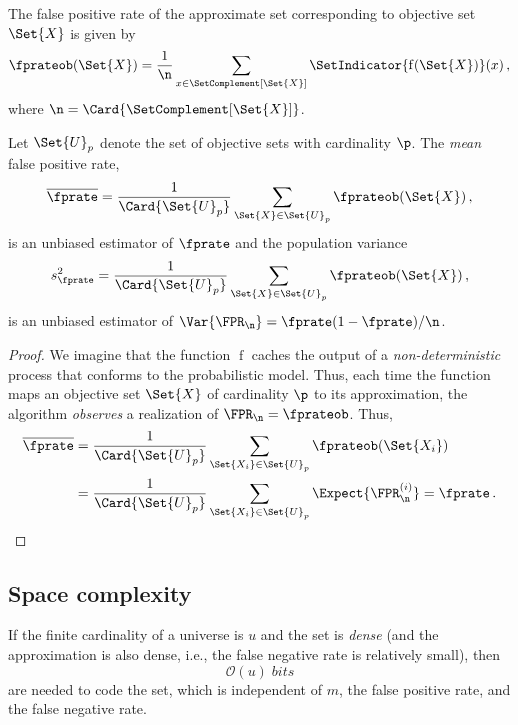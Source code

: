 \documentclass[ ../main.tex]{subfiles}
\begin{document}
The false positive rate of the approximate set corresponding 
to objective set $\Set{X}$ is given by
\begin{equation}
    \fprateob(\Set{X}) = \frac{1}{\n} \sum_{x \in \SetComplement[\Set{X}]} \SetIndicator{\operatorname{f}(\Set{X})}(x)\,,
\end{equation}
where $\n = \Card{\SetComplement[\Set{X}]}$.

Let $\Set{U}_p$ denote the set of objective sets with cardinality $\p$. The 
\emph{mean} false positive rate,
\begin{equation}
    \overline{\fprate} = \frac{1}{\Card{\Set{U}_p}}
        \sum_{\Set{X} \in \Set{U}_p} \fprateob(\Set{X})\,,
\end{equation}
is an unbiased estimator of $\fprate$ and the population variance
\begin{equation}
    s^2_\fprate = \frac{1}{\Card{\Set{U}_p}}
        \sum_{\Set{X} \in \Set{U}_p} \fprateob(\Set{X})\,,
\end{equation}
is an unbiased estimator of $\Var{\FPR_\n} = \fprate(1-\fprate)/\n$.
\begin{proof}
We imagine that the function $\operatorname{f}$ caches the output of a 
\emph{non-deterministic} process that conforms to the probabilistic model. Thus, 
each time the function maps an objective set $\Set{X}$ of cardinality $\p$ to 
its approximation, the algorithm \emph{observes} a realization of 
$\FPR_\n = \fprateob$. Thus,
\begin{align}
    \overline{\fprate}
        &= \frac{1}{\Card{\Set{U}_p}} 
            \sum_{\Set{X_i} \in \Set{U}_p} \fprateob(\Set{X_i})\\
        &= \frac{1}{\Card{\Set{U}_p}} 
            \sum_{\Set{X_i} \in \Set{U}_p} \Expect{\FPR_\n^{(i)}} = \fprate\,.
\end{align}
\end{proof}

\subsection{Space complexity}
\label{sec:space_comp}
If the finite cardinality of a universe is $u$ and the set is \emph{dense} (and 
the approximation is also dense, i.e., the false negative rate is relatively 
small), then
\begin{equation}
    \mathcal{O}(u) \; \si{bits}
\end{equation}
are needed to code the set, which is independent of $m$, the false positive 
rate, and the false negative rate.
\end{document}
